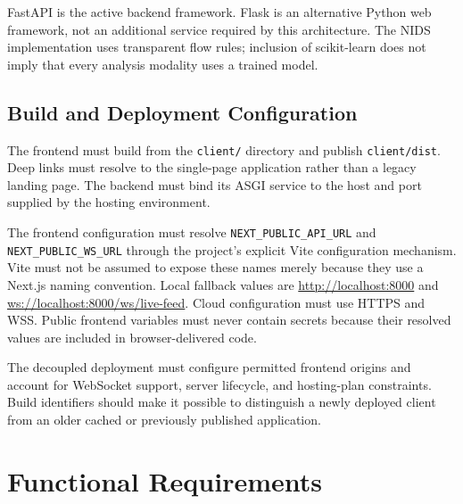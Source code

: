 \documentclass[12pt,a4paper,oneside]{report}
\begin{document}
FastAPI is the active backend framework. Flask is an alternative Python web framework, not an additional service required by this architecture. The NIDS implementation uses transparent flow rules; inclusion of scikit-learn does not imply that every analysis modality uses a trained model.

\subsection{Build and Deployment Configuration}

The frontend must build from the \texttt{client/} directory and publish \texttt{client/dist}. Deep links must resolve to the single-page application rather than a legacy landing page. The backend must bind its ASGI service to the host and port supplied by the hosting environment.

The frontend configuration must resolve \texttt{NEXT\_PUBLIC\_API\_URL} and \texttt{NEXT\_PUBLIC\_WS\_URL} through the project's explicit Vite configuration mechanism. Vite must not be assumed to expose these names merely because they use a Next.js naming convention. Local fallback values are \url{http://localhost:8000} and \url{ws://localhost:8000/ws/live-feed}. Cloud configuration must use HTTPS and WSS. Public frontend variables must never contain secrets because their resolved values are included in browser-delivered code.

The decoupled deployment must configure permitted frontend origins and account for WebSocket support, server lifecycle, and hosting-plan constraints. Build identifiers should make it possible to distinguish a newly deployed client from an older cached or previously published application.

\section{Functional Requirements}
\end{document}
